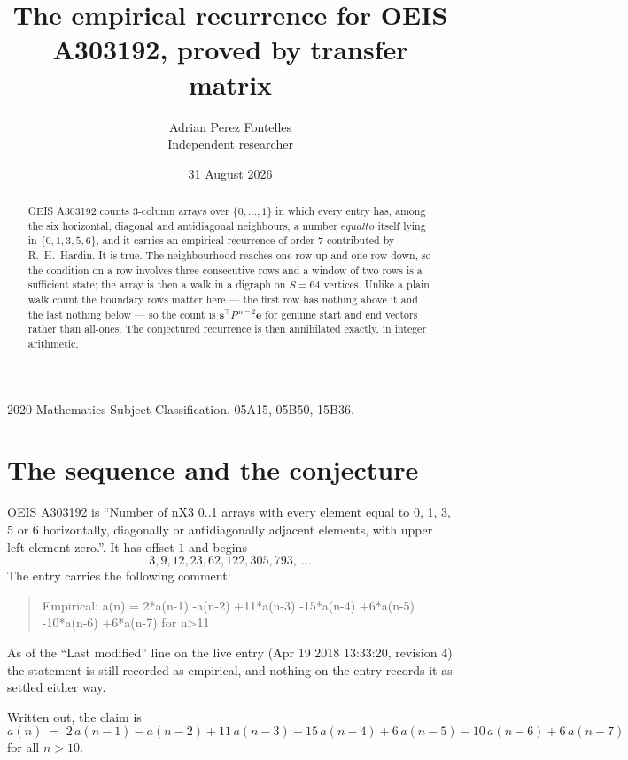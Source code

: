 \documentclass[11pt,a4paper]{article}
\title{The empirical recurrence for OEIS A303192, proved by transfer matrix}
\author{Adrian Perez Fontelles\\ \small Independent researcher}
\date{31 August 2026}
\theoremstyle{plain}
\theoremstyle{definition}
\begin{document}
\maketitle

\begin{abstract}
OEIS A303192 counts $3$-column arrays over $\{0,\dots,1\}$ in which every entry has,
among the six horizontal, diagonal and antidiagonal neighbours, a number $equal to$ itself lying in $\{0,1,3,5,6\}$, and it carries an empirical
recurrence of order $7$ contributed by R.~H.~Hardin. It is true. The neighbourhood
reaches one row up and one row down, so the condition on a row involves three consecutive
rows and a window of two rows is a sufficient state; the array is then a walk in a digraph
on $S=64$ vertices. Unlike a plain walk count the boundary rows matter here --- the first
row has nothing above it and the last nothing below --- so the count is
$\mathbf{s}^{\!\top}P^{\,n-2}\mathbf{e}$ for genuine start and end vectors rather than
all-ones. The conjectured recurrence is then annihilated exactly, in integer arithmetic.
\end{abstract}

\noindent\small 2020 Mathematics Subject Classification. 05A15, 05B50, 15B36.\normalsize

\section{The sequence and the conjecture}

OEIS A303192 is ``Number of nX3 0..1 arrays with every element equal to 0, 1, 3, 5 or 6 horizontally, diagonally or antidiagonally adjacent elements, with upper left element zero.''. It has offset
$1$ and begins
\[
3, 9, 12, 23, 62, 122, 305, 793,\ \dots
\]
The entry carries the following comment:
\begin{quote}\small
Empirical: a(n) = 2*a(n-1) -a(n-2) +11*a(n-3) -15*a(n-4) +6*a(n-5) -10*a(n-6) +6*a(n-7) for n>11
\end{quote}
As of the ``Last modified'' line on the live entry (Apr 19 2018 13:33:20, revision
4) the statement is still recorded as empirical, and nothing on the entry
records it as settled either way.

Written out, the claim is
\begin{equation}\label{eq:conj}
a(n)\;=\;2\,a(n-1) - a(n-2) + 11\,a(n-3) - 15\,a(n-4) + 6\,a(n-5) - 10\,a(n-6) + 6\,a(n-7)
\end{equation}
for all $n>10$.
\end{document}

